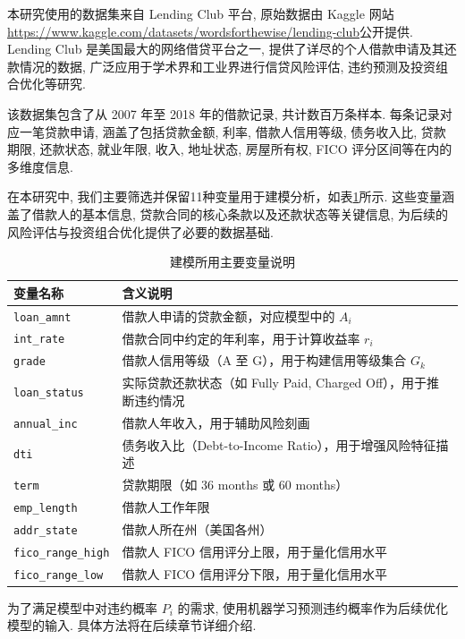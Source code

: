 \documentclass{write_paper}
\begin{document}
\label{subsec:dataset_description}

本研究使用的数据集来自 Lending Club 平台, 原始数据由 Kaggle 网站\url{https://www.kaggle.com/datasets/wordsforthewise/lending-club}公开提供. Lending Club 是美国最大的网络借贷平台之一, 提供了详尽的个人借款申请及其还款情况的数据, 广泛应用于学术界和工业界进行信贷风险评估, 违约预测及投资组合优化等研究. 

该数据集包含了从 2007 年至 2018 年的借款记录, 共计数百万条样本. 每条记录对应一笔贷款申请, 涵盖了包括贷款金额, 利率, 借款人信用等级, 债务收入比, 贷款期限, 还款状态, 就业年限, 收入, 地址状态, 房屋所有权, FICO 评分区间等在内的多维度信息. 

在本研究中, 我们主要筛选并保留11种变量用于建模分析，如表\ref{tab:dataset_variables}所示. 这些变量涵盖了借款人的基本信息, 贷款合同的核心条款以及还款状态等关键信息, 为后续的风险评估与投资组合优化提供了必要的数据基础.
\begin{table}[htbp]
\centering
\caption{建模所用主要变量说明}
\label{tab:dataset_variables}
\begin{tabular}{ll}
\toprule
变量名称 & 含义说明 \\
\midrule
\texttt{loan\_amnt} & 借款人申请的贷款金额，对应模型中的 $A_i$ \\
\texttt{int\_rate} & 借款合同中约定的年利率，用于计算收益率 $r_i$ \\
\texttt{grade} & 借款人信用等级（A 至 G），用于构建信用等级集合 $G_k$ \\
\texttt{loan\_status} & 实际贷款还款状态（如 Fully Paid, Charged Off），用于推断违约情况 \\
\texttt{annual\_inc} & 借款人年收入，用于辅助风险刻画 \\
\texttt{dti} & 债务收入比（Debt-to-Income Ratio），用于增强风险特征描述 \\
\texttt{term} & 贷款期限（如 36 months 或 60 months） \\
\texttt{emp\_length} & 借款人工作年限 \\
\texttt{addr\_state} & 借款人所在州（美国各州） \\
\texttt{fico\_range\_high} & 借款人 FICO 信用评分上限，用于量化信用水平 \\
\texttt{fico\_range\_low} & 借款人 FICO 信用评分下限，用于量化信用水平 \\
\bottomrule
\end{tabular}
\end{table}
 

为了满足模型中对违约概率 $P_i$ 的需求, 使用机器学习预测违约概率作为后续优化模型的输入. 具体方法将在后续章节详细介绍.
\end{document}
